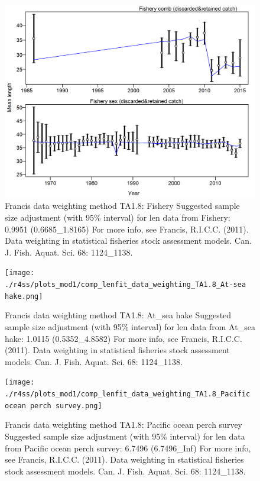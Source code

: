\documentclass[12pt,]{article}
\begin{document}
\begin{figure}
\centering
\includegraphics{./r4ss/plots_mod1/comp_lenfit_data_weighting_TA1.8_Fishery.png}
\caption{Francis data weighting method TA1.8: Fishery Suggested sample
size adjustment (with 95\% interval) for len data from Fishery: 0.9951
(0.6685\_1.8165) For more info, see Francis, R.I.C.C. (2011). Data
weighting in statistical fisheries stock assessment models. Can. J.
Fish. Aquat. Sci. 68: 1124\_1138. \label{fig:weighting_len_fishery}}
\end{figure}

\begin{figure}
\centering
\texttt{[image: ./r4ss/plots\_mod1/comp\_lenfit\_data\_weighting\_TA1.8\_At-sea hake.png]}
\caption{Francis data weighting method TA1.8: At\_sea hake Suggested
sample size adjustment (with 95\% interval) for len data from At\_sea
hake: 1.0115 (0.5352\_4.8582) For more info, see Francis, R.I.C.C.
(2011). Data weighting in statistical fisheries stock assessment models.
Can. J. Fish. Aquat. Sci. 68: 1124\_1138.
\label{fig:weighting_len_ashop}}
\end{figure}

\begin{figure}
\centering
\texttt{[image: ./r4ss/plots\_mod1/comp\_lenfit\_data\_weighting\_TA1.8\_Pacific ocean perch survey.png]}
\caption{Francis data weighting method TA1.8: Pacific ocean perch survey
Suggested sample size adjustment (with 95\% interval) for len data from
Pacific ocean perch survey: 6.7496 (6.7496\_Inf) For more info, see
Francis, R.I.C.C. (2011). Data weighting in statistical fisheries stock
assessment models. Can. J. Fish. Aquat. Sci. 68: 1124\_1138.
\label{fig:weighting_len_pop}}
\end{figure}
\end{document}
